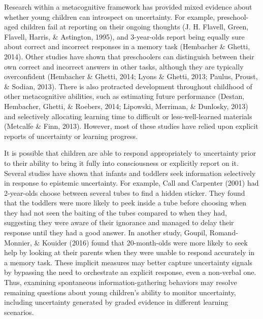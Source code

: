\documentclass[10pt, letterpaper]{article}
\begin{document}
Research within a metacognitive framework has provided mixed evidence
about whether young children can introspect on uncertainty. For example,
preschool-aged children fail at reporting on their ongoing thoughts (J.
H. Flavell, Green, Flavell, Harris, \& Astington, 1995), and 3-year-olds
report being equally sure about correct and incorrect responses in a
memory task (Hembacher \& Ghetti, 2014). Other studies have shown that
preschoolers can distinguish between their own correct and incorrect
answers in other tasks, although they are typically overconfident
(Hembacher \& Ghetti, 2014; Lyons \& Ghetti, 2013; Paulus, Proust, \&
Sodian, 2013). There is also protracted development throughout childhood
of other metacognitive abilities, such as estimating future performance
(Destan, Hembacher, Ghetti, \& Roebers, 2014; Lipowski, Merriman, \&
Dunlosky, 2013) and selectively allocating learning time to difficult or
less-well-learned materials (Metcalfe \& Finn, 2013). However, most of
these studies have relied upon explicit reports of uncertainty or
learning progress.

It is possible that children are able to respond appropriately to
uncertainty prior to their ability to bring it fully into consciousness
or explicitly report on it. Several studies have shown that infants and
toddlers seek information selectively in response to epistemic
uncertainty. For example, Call and Carpenter (2001) had 2-year-olds
choose between several tubes to find a hidden sticker. They found that
the toddlers were more likely to peek inside a tube before choosing when
they had not seen the baiting of the tubes compared to when they had,
suggesting they were aware of their ignorance and managed to delay their
response until they had a good answer. In another study, Goupil,
Romand-Monnier, \& Kouider (2016) found that 20-month-olds were more
likely to seek help by looking at their parents when they were unable to
respond accurately in a memory task. These implicit measures may better
capture uncertainty signals by bypassing the need to orchestrate an
explicit response, even a non-verbal one. Thus, examining spontaneous
information-gathering behaviors may resolve remaining questions about
young children's ability to monitor uncertainty, including uncertainty
generated by graded evidence in different learning scenarios.
\end{document}
